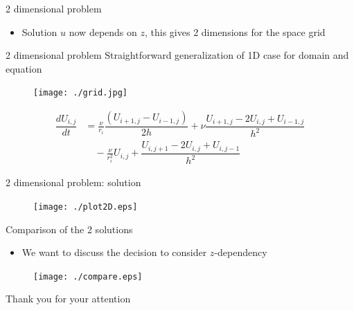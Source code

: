 \documentclass{beamer}
\begin{document}
\begin{frame}{2 dimensional problem}
\begin{itemize}
\item Solution $u$ now depends on $z$, this gives 2 dimensions for the space grid
\end{itemize}
\end{frame}

\begin{frame}{2 dimensional problem}
Straightforward generalization of 1D case for domain and equation

\begin{figure}[!h]
\centering
\texttt{[image: ./grid.jpg]}
\end{figure}
\begin{align*}
\dfrac{dU_{i,j}}{dt}&= \frac{\nu}{r_i}\dfrac{(U_{i+1,j}-U_{i-1,j})}{2h}+\nu\dfrac{U_{i+1,j}-2U_{i,j}+U_{i-1,j}}{h^2}\\ &\quad-\frac{\nu}{r_{i}^2}U_{i,j} 
+\dfrac{U_{i,j+1}-2U_{i,j}+U_{i,j-1}}{h^2} 
\end{align*}
\end{frame}

\begin{frame}{2 dimensional problem: solution}

\begin{figure}[!h]
\centering
\texttt{[image: ./plot2D.eps]}
\end{figure}

\end{frame}


\begin{frame}{Comparison of the 2 solutions}
\begin{itemize}
\item We want to discuss the decision to consider $z$-dependency
\end{itemize}

\begin{figure}[!h]
\centering
\texttt{[image: ./compare.eps]}
\end{figure}
\end{frame}

\begin{frame}
\begin{center}
Thank you for your attention
\end{center}
\end{frame}
\end{document}
